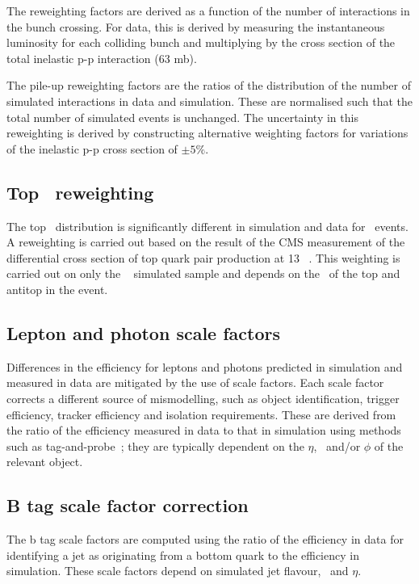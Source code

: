 The reweighting factors are derived as a function of the number 
of interactions in the bunch crossing. For data, this is derived by measuring the instantaneous luminosity
for each colliding bunch and multiplying by the cross section 
of the total inelastic p-p interaction (63 mb). 

The pile-up reweighting factors are the ratios of the distribution of the number
of simulated interactions in data and simulation. These are normalised such that the 
total number of simulated events is unchanged. The uncertainty in this reweighting is derived by 
constructing alternative weighting factors for variations 
of the inelastic p-p cross section of $\pm5\%$.

\subsection{Top \pt~reweighting}

The top \pt~distribution is significantly different in simulation and data for 
\ttbar~events. A reweighting is carried out based on the result of the CMS 
measurement of the differential cross section of top quark pair production 
at 13 \TeV~\cite{toppt}. This weighting is carried out on only the \ttbar~ 
simulated sample and depends on the \pt~of the top and antitop in the event.

\subsection{Lepton and photon scale factors}
\label{sec:scale-factor}
Differences in the efficiency for leptons and photons predicted in 
simulation and measured in data are mitigated by the use of scale factors. 
Each scale factor corrects a different source of mismodelling, such as 
object identification, trigger efficiency, tracker efficiency and isolation requirements.
These are derived from the ratio of the efficiency measured in data to that
in simulation using methods such as tag-and-probe~\cite{MuonReco};
they are typically dependent on the $\eta$, \pt~and/or $\phi$ of the relevant object.

\subsection{B tag scale factor correction}

The b tag scale factors are computed using the ratio of the efficiency in data
for identifying a jet as originating from a bottom quark 
to the efficiency in simulation. These scale factors depend on simulated jet flavour, \pt~and $\eta$. 

